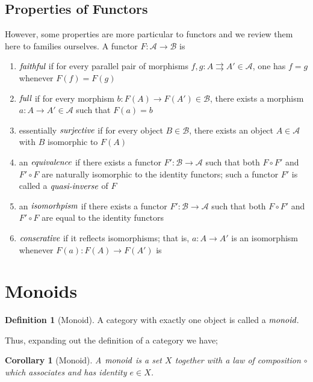 \documentclass[10pt, oneside, reqno]{amsart}
\theoremstyle{plain}%
\newtheorem*{cor}{Corollary}
\theoremstyle{definition}
\newtheorem{defn}[thm]{Definition}
\theoremstyle{remark}
\begin{document}
\subsection{Properties of Functors} %
\label{subsec:functorsproperties}
However, some properties are more particular to functors and we review them here to families ourselves.
A functor $F : \mathcal{A} \to \mathcal{B}$ is
\begin{enumerate}
 \item $\emph{faithful}$ if for every parallel pair of morphisms $f,g : A \rightrightarrows A' \in \mathcal{A}$, one has $f = g$ whenever $F(f) = F(g)$
 \item $\emph{full}$ if for every morphism $b: F(A) \to F(A') \in \mathcal{B}$, there exists a morphism $a: A \to A' \in \mathcal{A}$ such that $F(a) = b$
 \item essentially $\emph{surjective}$ if for every object $B \in \mathcal{B}$, there exists an object $A \in \mathcal{A}$ with $B$ isomorphic to $F(A)$
 \item an $\emph{equivalence}$ if there exists a functor $F': \mathcal{B} \to \mathcal{A}$ such that both $F \circ F'$ and $F' \circ F$ are naturally
 isomorphic to the identity functors; such a functor $F'$ is called a $\emph{quasi-inverse}$ of $F$
 \item an $\emph{isomorhpism}$ if there exists a functor $F': \mathcal{B} \to \mathcal{A}$ such that both $F \circ F'$ and $F' \circ F$
 are equal to the identity functors
 \item $\emph{conserative}$ if it reflects isomorphisms; that is, $a: A \to A'$ is an isomorphism whenever $F(a): F(A) \to F(A')$ is
\end{enumerate}


\section{Monoids} %
\label{sec:monoids}

\begin{defn}[Monoid]
A category with exactly one object is called a $\emph{monoid}$.
\end{defn}

Thus, expanding out the definition of a category we have;
\begin{cor}[Monoid]
A $\emph{monoid}$ is a set $X$ together with a law of composition $\circ$
which associates and has identity $e \in X$.
\end{cor}
\end{document}
